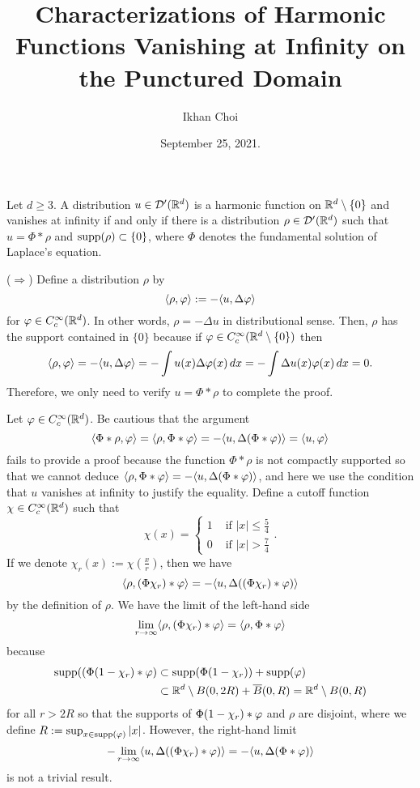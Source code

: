 \documentclass[12pt]{article}
\title{Characterizations of Harmonic Functions Vanishing at Infinity on the Punctured Domain}
\author{Ikhan Choi}
\date{September 25, 2021.}
\begin{document}
\maketitle

\begin{thm*}
Let $d\ge3$.
A distribution $u\in\mathcal{D}'(\mathbb{R}^d)$ is a harmonic function on $\mathbb{R}^d\setminus\{0\}$ and vanishes at infinity if and only if there is a distribution $\rho\in\mathcal{D}'(\mathbb{R}^d)$ such that $u=\Phi*\rho$ and $\operatorname{supp}(\rho)\subset\{0\}$, where $\Phi$ denotes the fundamental solution of Laplace's equation.
\end{thm*}
\begin{pf}
($\Rightarrow$)
Define a distribution $\rho$ by
\[\langle\rho,\varphi\rangle:=-\langle u,\Delta\varphi\rangle\]
for $\varphi\in C_c^\infty(\mathbb{R}^d)$.
In other words, $\rho=-\Delta u$ in distributional sense.
Then, $\rho$ has the support contained in $\{0\}$ because if $\varphi\in C_c^\infty(\mathbb{R}^d\setminus\{0\})$ then
\[\langle\rho,\varphi\rangle=-\langle u,\Delta \varphi\rangle=-\int u(x)\Delta\varphi(x)\,dx=-\int\Delta u(x)\varphi(x)\,dx=0.\]
Therefore, we only need to verify $u=\Phi*\rho$ to complete the proof.

Let $\varphi\in C_c^\infty(\mathbb{R}^d)$.
Be cautious that the argument
\[\langle\Phi*\rho,\varphi\rangle=\langle\rho,\Phi*\varphi\rangle=-\langle u,\Delta(\Phi*\varphi)\rangle=\langle u,\varphi\rangle\]
fails to provide a proof because the function $\Phi*\rho$ is not compactly supported so that we cannot deduce $\langle\rho,\Phi*\varphi\rangle=-\langle u,\Delta(\Phi*\varphi)\rangle$, and here we use the condition that $u$ vanishes at infinity to justify the equality.
Define a cutoff function $\chi\in C_c^\infty(\mathbb{R}^d)$ such that
\[\chi(x)=\begin{cases}1&\text{ if }|x|\le\frac54\\0&\text{ if }|x|>\frac74\end{cases}.\]
If we denote $\chi_r(x):=\chi(\frac xr)$, then we have
\[\langle\rho,(\Phi\chi_r)*\varphi\rangle=-\langle u,\Delta((\Phi\chi_r)*\varphi)\rangle\]
by the definition of $\rho$.
We have the limit of the left-hand side
\[\lim_{r\to\infty}\langle\rho,(\Phi\chi_r)*\varphi\rangle=\langle\rho,\Phi*\varphi\rangle\]
because
\begin{align*}
\operatorname{supp}((\Phi(1-\chi_r)*\varphi)&\subset\operatorname{supp}(\Phi(1-\chi_r))+\operatorname{supp}(\varphi)\\
&\subset\mathbb{R}^d\setminus B(0,2R)+\overline B(0,R)=\mathbb{R}^d\setminus B(0,R)
\end{align*}
for all $r>2R$ so that the supports of $\Phi(1-\chi_r)*\varphi$ and $\rho$ are disjoint, where we define $R:=\sup_{x\in\operatorname{supp}(\varphi)}|x|$.
However, the right-hand limit
\[-\lim_{r\to\infty}\langle u,\Delta((\Phi\chi_r)*\varphi)\rangle=-\langle u,\Delta(\Phi*\varphi)\rangle\]
is not a trivial result.


\end{pf}
\end{document}
